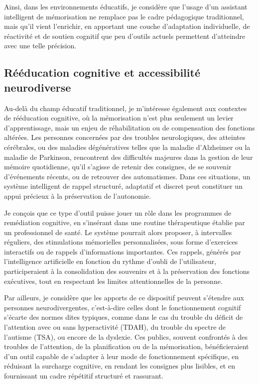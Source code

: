 \documentclass[11pt,a4paper]{report}
\begin{document}
Ainsi, dans les environnements éducatifs, je considère que l’usage d’un assistant intelligent de mémorisation ne remplace pas le cadre pédagogique traditionnel, mais qu’il vient l’enrichir, en apportant une couche d’adaptation individuelle, de réactivité et de soutien cognitif que peu d’outils actuels permettent d’atteindre avec une telle précision.

\subsection{Rééducation cognitive et accessibilité neurodiverse}

Au-delà du champ éducatif traditionnel, je m’intéresse également aux contextes de rééducation cognitive, où la mémorisation n’est plus seulement un levier d’apprentissage, mais un enjeu de réhabilitation ou de compensation des fonctions altérées. Les personnes concernées par des troubles neurologiques, des atteintes cérébrales, ou des maladies dégénératives telles que la maladie d’Alzheimer ou la maladie de Parkinson, rencontrent des difficultés majeures dans la gestion de leur mémoire quotidienne, qu’il s’agisse de retenir des consignes, de se souvenir d’événements récents, ou de retrouver des automatismes. Dans ces situations, un système intelligent de rappel structuré, adaptatif et discret peut constituer un appui précieux à la préservation de l’autonomie.

Je conçois que ce type d’outil puisse jouer un rôle dans les programmes de remédiation cognitive, en s’insérant dans une routine thérapeutique établie par un professionnel de santé. Le système pourrait alors proposer, à intervalles réguliers, des stimulations mémorielles personnalisées, sous forme d’exercices interactifs ou de rappels d’informations importantes. Ces rappels, générés par l’intelligence artificielle en fonction du rythme d’oubli de l’utilisateur, participeraient à la consolidation des souvenirs et à la préservation des fonctions exécutives, tout en respectant les limites attentionnelles de la personne.

Par ailleurs, je considère que les apports de ce dispositif peuvent s’étendre aux personnes neurodivergentes, c’est-à-dire celles dont le fonctionnement cognitif s’écarte des normes dites typiques, comme dans le cas du trouble du déficit de l’attention avec ou sans hyperactivité (TDAH), du trouble du spectre de l’autisme (TSA), ou encore de la dyslexie. Ces publics, souvent confrontés à des troubles de l’attention, de la planification ou de la mémorisation, bénéficieraient d’un outil capable de s’adapter à leur mode de fonctionnement spécifique, en réduisant la surcharge cognitive, en rendant les consignes plus lisibles, et en fournissant un cadre répétitif structuré et rassurant.
\end{document}
